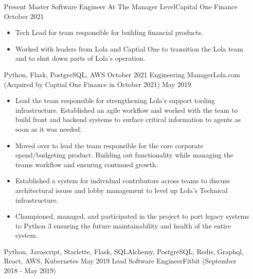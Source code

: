 %
%
%
\begin{experiences}
  \experience
  {Present}  {Master Software Engineer At The Manager Level}{Capital One Finance}
  {October 2021}   {
                      \begin{itemize}
                        \item Tech Lead for team responsible for building financial products.
                        \item Worked with leaders from Lola and Captial One to transition the Lola team and to shut down parts of Lola's operation. 
                      \end{itemize}
                  }
                  {Python, Flask, PostgreSQL, AWS}
  \emptySeparator
  \experience
  {October 2021}  {Engineering Manager}{Lola.com (Acquired by Captial One Finance in October 2021)}
  {May 2019}   {
                      \begin{itemize}
                        \item Lead the team responsible for strengthening Lola's support tooling infrastructure. Established an agile workflow and worked with the team to build front and backend systems to surface critical information to agents as soon as it was needed.
                        \item Moved over to lead the team responsible for the core corporate spend/budgeting product. Building out functionality while managing the teams workflow and ensuring continued growth.
                        \item Established a system for individual contributors across teams to discuss architectural issues and lobby management to level up Lola's Technical infrastructure. 
                        \item Championed, managed, and participated in the project to port legacy systems to Python 3 ensuring the future maintainability and health of the entire system.
                      \end{itemize}
                  }
                  {Python, Javascript, Starlette, Flask, SQLAlchemy, PostgreSQL, Redis, Graphql, React, AWS, Kubernetes}
  \emptySeparator
  \experience
  {May 2019}  {Lead Software Engineer}{Fitbit {\footnotesize (September 2018 - May 2019)}}

\end{experiences}
